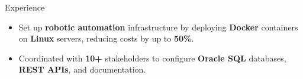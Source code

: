 \documentclass{resume} %
\begin{document}
\begin{workSection}{Experience}
	\experienceItem[
	company=Texas Instruments,
	location=Dallas{,} TX,
	position=Information Technology Intern,
	duration= May 2024 - August 2024,
	]
	\begin{itemize}
		\vspace{-0.5em}
		\itemsep -6pt {}
		\item Set up \textbf{robotic automation} infrastructure by deploying \textbf{Docker} containers on \textbf{Linux} servers, reducing costs by up to \textbf{50\%}. %
		\item Coordinated with \textbf{10+} stakeholders to configure \textbf{Oracle SQL} databases, \textbf{REST APIs}, and documentation.
	\end{itemize}
	
	\experienceItem[
	company=GNOME Foundation,
	location=Remote,
	position=Open-Source Contributor,
	duration=December 2023 {-} June 2024
	]
	\begin{itemize}
		\vspace{-0.5em}
		\itemsep -6pt {}


\end{itemize}
\end{workSection}
\end{document}
